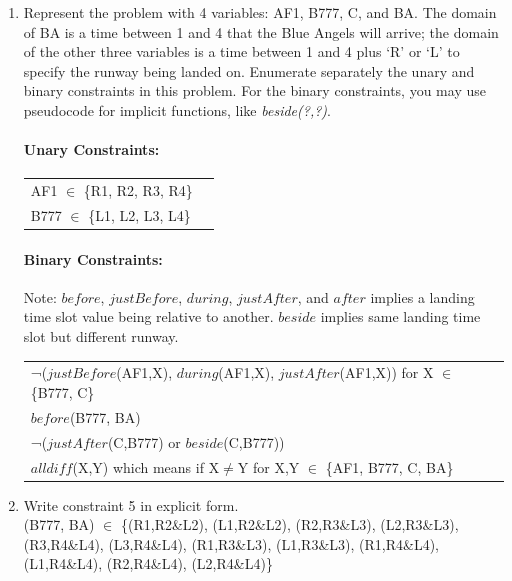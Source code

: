 \documentclass[11pt]{article}
\begin{document}
\begin{enumerate}

\item Represent the problem with 4 variables: AF1, B777, C, and
  BA. The domain of BA is a time between 1 and 4 that the Blue Angels
  will arrive; the domain of the other three variables is a time
  between 1 and 4 plus `R' or `L' to specify the runway being landed
  on.  Enumerate separately the unary and binary constraints in this
  problem. For the binary constraints, you may use pseudocode for
  implicit functions, like {\it beside(?,?)}.

  \paragraph{Unary Constraints:}

  \begin{flushleft}\begin{tabular}{ll}
  AF1 $\in$ \{R1, R2, R3, R4\}  &  \\
  B777 $\in$ \{L1, L2, L3, L4\}  &  \\
  \end{tabular}\end{flushleft}

  \paragraph{Binary Constraints:}
  Note: $before$, $justBefore$, $during$, $justAfter$, and $after$ implies a landing time slot value being relative to another. $beside$ implies same landing time slot but different runway.

  \begin{flushleft}\begin{tabular}{ll}
  ¬($justBefore$(AF1,X), $during$(AF1,X), $justAfter$(AF1,X)) for X $\in$ \{B777, C\}  & \\
  $before$(B777, BA) & \\
  ¬($justAfter$(C,B777) or $beside$(C,B777)) & \\
  $alldiff$(X,Y) which means if X$\neq$Y for X,Y $\in$ \{AF1, B777, C, BA\} & \\
  \end{tabular}\end{flushleft}

\item Write constraint 5 in explicit form. \\

(B777, BA) $\in$ \{(R1,R2\&L2), (L1,R2\&L2), (R2,R3\&L3), (L2,R3\&L3), (R3,R4\&L4), (L3,R4\&L4), (R1,R3\&L3), (L1,R3\&L3), (R1,R4\&L4), (L1,R4\&L4), (R2,R4\&L4), (L2,R4\&L4)\}


\end{enumerate}
\end{document}
